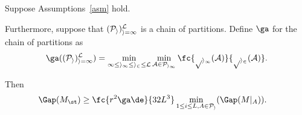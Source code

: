 \begin{thm}\label{thm:sim-temp}
Suppose Assumptions~\ref{asm} hold.

Furthermore, suppose that $(\cal P_i)_{i=1}^L$ is a chain of partitions. %
Define $\ga$ for the chain of partitions as 
$$
\ga((\cal P_i)_{i=1}^{L}) =\min_{1\le i_1\le i_2\le L}\min_{A\in \cal P_{i_1}}
\fc{p_{{i_1}}(A)}{p_{{i_2}}(A)}.
$$

%
%
%
Then 
\begin{align}
\Gap(M_{\st}) &\ge\fc{r^2\ga \de}{32L^3} \min_{1\le i\le L, A\in \cal P_i} (\Gap(M|_A)).
\end{align}
\end{thm}
